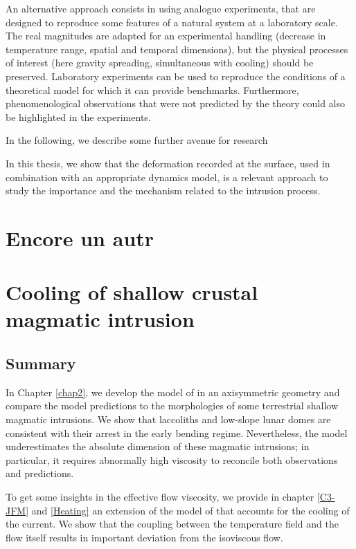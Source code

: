 An alternative  approach consists in using  analogue experiments, that
are  designed to  reproduce some  features of  a natural  system at  a
laboratory scale. The real magnitudes  are adapted for an experimental
handling  (decrease   in  temperature  range,  spatial   and  temporal
dimensions),  but the  physical  processes of  interest (here  gravity
spreading, simultaneous with cooling) should be preserved.  Laboratory
experiments can be  used to reproduce the conditions  of a theoretical
model   for   which   it   can   provide   benchmarks.    Furthermore,
phenomenological observations  that were  not predicted by  the theory
could also be highlighted in the experiments.

In the following, we describe some further avenue for research

In this thesis, we show that  the deformation recorded at the surface,
used in combination with an  appropriate dynamics model, is a relevant
approach  to study  the importance  and the  mechanism related  to the
intrusion process.

\section{Encore un autr}

\section{Cooling of shallow crustal magmatic intrusion}
\label{sec:cool-shall-intr}

\subsection{Summary}
\label{sec:summary-1}

In Chapter \ref{chap2}, we develop the model of \citet{Michaut:2011kg}
in an axisymmetric  geometry and compare the model  predictions to the
morphologies of some terrestrial shallow magmatic intrusions.  We show
that laccoliths  and low-slope lunar  domes are consistent  with their
arrest  in   the  early  bending  regime.    Nevertheless,  the  model
underestimates the absolute dimension of these magmatic intrusions; in
particular, it  requires abnormally  high viscosity to  reconcile both
observations and predictions.

To get  some insights in the  effective flow viscosity, we  provide in
chapter \ref{C3-JFM}  and \ref{Heating} an  extension of the  model of
\citet{Michaut:2011kg}   that  accounts   for  the   cooling  of   the
current. We show  that the coupling between the  temperature field and
the flow  itself results  in important  deviation from  the isoviscous
flow.

